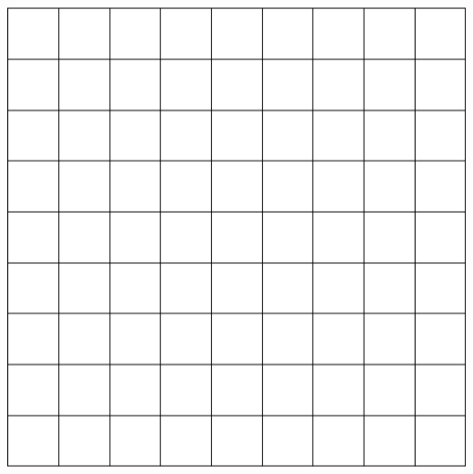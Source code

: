 \documentclass[a4paper, 12pt]{article}
\begin{document}
\begin{LKtext}
\begin{minipage}{0.65\textwidth}
	\end{minipage}
	\hfill
	\begin{minipage}{0.25\textwidth}\vspace{0pt}
		\includegraphics[width=\linewidth]{A_2.png}
	\end{minipage}


\end{LKtext}
\end{document}
